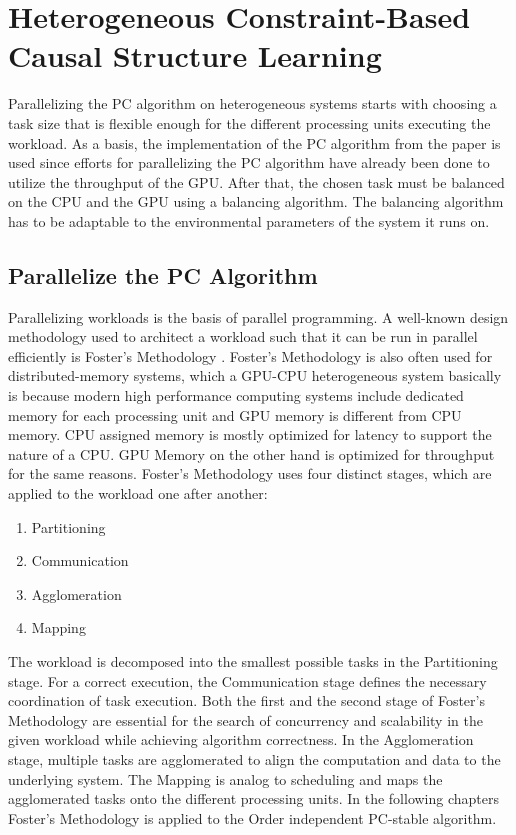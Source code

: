 \chapter{Heterogeneous Constraint-Based Causal Structure Learning}
Parallelizing the PC algorithm on heterogeneous systems starts with choosing a task size that is flexible enough for the different processing units executing the workload. As a basis, the implementation of the PC algorithm from the paper \cite{schmidtOrderIndependentConstraintBasedCausal2018} is used since efforts for parallelizing the PC algorithm have already been done to utilize the throughput of the GPU. After that, the chosen task must be balanced on the CPU and the GPU using a balancing algorithm. The balancing algorithm has to be adaptable to the environmental parameters of the system it runs on.

\section{Parallelize the PC Algorithm}
Parallelizing workloads is the basis of parallel programming. A well-known design methodology used to architect a workload such that it can be run in parallel efficiently is Foster's Methodology \cite{fosterDesigningBuildingParallel1995}. Foster's Methodology is also often used for distributed-memory systems, which a GPU-CPU heterogeneous system basically is because modern high performance computing systems include dedicated memory for each processing unit and GPU memory is different from CPU memory. CPU assigned memory is mostly optimized for latency to support the nature of a CPU. GPU Memory on the other hand is optimized for throughput for the same reasons. Foster's Methodology uses four distinct stages, which are applied to the workload one after another:

\begin{enumerate}
    \item Partitioning
    \item Communication
    \item Agglomeration 
    \item Mapping
\end{enumerate}

The workload is decomposed into the smallest possible tasks in the Partitioning stage. For a correct execution, the Communication stage defines the necessary coordination of task execution. Both the first and the second stage of Foster's Methodology are essential for the search of concurrency and scalability in the given workload while achieving algorithm correctness. In the Agglomeration stage, multiple tasks are agglomerated to align the computation and data to the underlying system. The Mapping is analog to scheduling and maps the agglomerated tasks onto the different processing units. In the following chapters Foster's Methodology is applied to the Order independent PC-stable algorithm.


